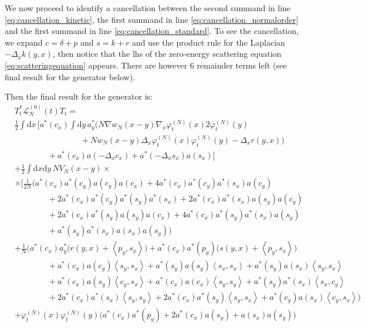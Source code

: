 \documentclass[11pt,a4paper]{scrartcl} %
\newcommand{\di}{\textrm{d}}		%
\newcommand{\Lcal}{\mathcal{L}}		%
\newcommand{\scal}[2]{\left<#1,#2\right>} %
\newcommand{\ph}{\varphi_t^{(N)}}	%
\newcommand{\eqr}[1]{\eqref{eq:#1}}			%
\begin{document}
We now proceed to identify a cancellation between the second summand in line \eqr{cancellation_kinetic}, the first summand in line \eqr{cancellation_normalorder} and the first summand in line \eqr{cancellation_standard}. To see the cancellation, we expand $c = \delta + p$ and $s = k + r$ and use the product rule for the Laplacian $-\Delta_x k(y,x)$, then notice that the lhs of the zero-energy scattering equation \eqr{scatteringequation} appears. There are however 6 remainder terms left (see final result for the generator below).

Then the final result for the generator is:
\begin{align}
& T^*_t \Lcal_N^{(0)}(t) T_t = \nonumber \\ 
& \frac{1}{2} \int \di x\, \bigg[ a^*(c_x) \int \di y\, a^*_y \Big( N \nabla w_N(x-y) \nabla_x \ph(x) 2 \ph(y) \\
& \qquad\qquad \qquad\qquad						+ Nw_N(x-y) \Delta_x \ph(x) \ph(y) - \Delta_x r(y,x) \Big) \\
& \qquad\qquad 			+ a^*(c_x) a(-\Delta_x c_x) + a^*(-\Delta_x s_x) a(s_x) \bigg] \\
& + \frac{1}{2}\int \di x \di y\, NV_N(x-y) \times \nonumber \\
& \times \Big[   \frac{1}{2N}\bigg( a^*(c_x) a^*(c_y) a(c_y) a(c_x) + 4 a^*(c_x) a^*(c_y) a^*(s_x) a(c_y) \\
				      & \qquad\qquad + 2 a^*(c_x) a^*(c_y) a^*(s_y) a^*(s_x) + 2 a^*(c_x) a^*(s_x) a(s_y) a(c_y) \\
				      & \qquad\qquad + 2 a^*(c_x) a^*(s_y) a(s_y) a(c_x) + 4 a^*(c_x) a^*(s_y) a^*(s_x) a(s_y) \\
				      & \qquad\qquad + a^*(s_y) a^*(s_x) a(s_x) a(s_y) \bigg) \\
& + \frac{1}{N}\bigg(   a^*(c_x) a^*_y \Big( r(y,x) + \scal{p_y}{s_x} \Big) + a^*(c_x) a^*(p_y) \Big( s(y,x) + \scal{p_y}{s_x} \Big) \\
      & \qquad\qquad + a^*(c_x) a(c_y) \scal{s_y}{s_x} + a^*(s_y) a(s_y) \scal{s_x}{s_x} + a^*(s_y) a(s_x) \scal{s_y}{s_x}\\
      & \qquad\qquad + a^*(c_x) a(s_y) \scal{c_y}{s_x} + a^*(c_x) a(c_x) \scal{s_y}{s_y} + a^*(s_y) a^*(s_x) \scal{s_x}{c_y}\\
      & \qquad\qquad + 2a^*(c_x) a^*(s_x) \scal{s_y}{s_y} + 2a^*(c_x)a^*(s_y) \scal{s_y}{s_x} + a^*(c_y) a(s_x) \scal{c_y}{s_x}    \bigg) \\
& + \ph(x)\ph(y) \Big( a^*(c_x) a^*(p_y) + 2 a^*(c_x) a(s_y) +a(s_x) a(s_y) \Big) \\

\end{align}
\end{document}

